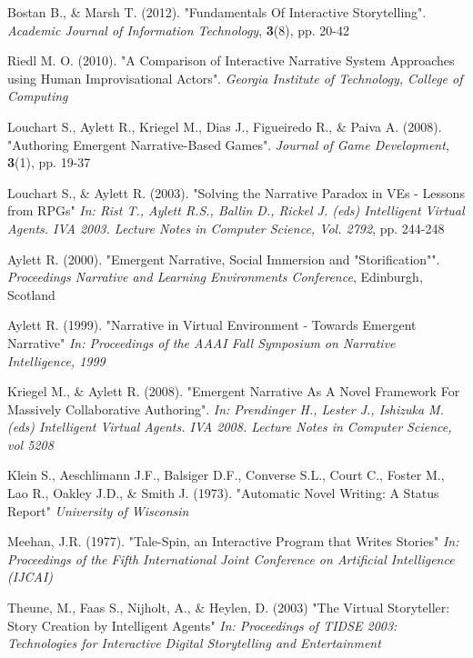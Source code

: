 \documentclass{sig-alternate-05-2015}
\begin{document}
\begin{thebibliography}{20}

Bostan B., \& Marsh T. (2012). 
"Fundamentals Of Interactive Storytelling". 
\textit{Academic Journal of Information Technology}, \textbf{3}(8), pp. 20-42

Riedl M. O. (2010). 
"A Comparison of Interactive Narrative System Approaches using Human Improvisational Actors".
\textit{Georgia Institute of Technology, College of Computing}

Louchart S., Aylett R., Kriegel M., Dias J., Figueiredo R., \& Paiva A. (2008).
"Authoring Emergent Narrative-Based Games".
\textit{Journal of Game Development}, \textbf{3}(1), pp. 19-37

Louchart S., \& Aylett R. (2003).
"Solving the Narrative Paradox in VEs - Lessons from RPGs"
\textit{In: Rist T., Aylett R.S., Ballin D., Rickel J. (eds) Intelligent Virtual Agents. IVA 2003. Lecture Notes in Computer Science, Vol. 2792}, pp. 244-248

Aylett R. (2000).
"Emergent Narrative, Social Immersion and "Storification"".
\textit{Proceedings Narrative and Learning Environments Conference}, Edinburgh, Scotland

Aylett R. (1999).
"Narrative in Virtual Environment - Towards Emergent Narrative"
\textit{In: Proceedings of the AAAI Fall Symposium on Narrative Intelligence, 1999}

Kriegel M., \& Aylett R. (2008).
"Emergent Narrative As A Novel Framework For Massively Collaborative Authoring".
\textit{In: Prendinger H., Lester J., Ishizuka M. (eds) Intelligent Virtual Agents. IVA 2008. Lecture Notes in Computer Science, vol 5208}

Klein S., Aeschlimann J.F., Balsiger D.F., Converse S.L., Court C., Foster M., Lao R., Oakley J.D., \& Smith J. (1973).
"Automatic Novel Writing: A Status Report"
\textit{University of Wisconsin}

Meehan, J.R. (1977).
"Tale-Spin, an Interactive Program that Writes Stories"
\textit{In: Proceedings of the Fifth International Joint Conference on Artificial Intelligence (IJCAI)}

Theune, M., Faas S., Nijholt, A., \& Heylen, D. (2003)
"The Virtual Storyteller: Story Creation by Intelligent Agents"
\textit{In: Proceedings of TIDSE 2003: Technologies for Interactive Digital Storytelling and Entertainment}


\end{thebibliography}
\end{document}
